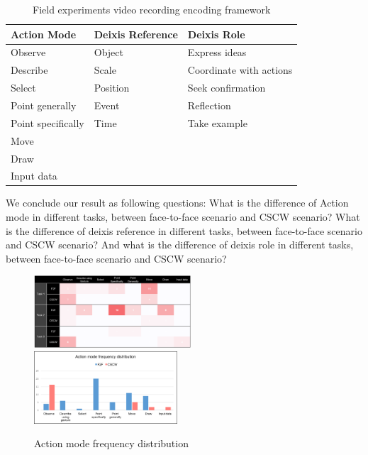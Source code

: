 \documentclass[12pt,twoside]{article}
\begin{document}
\begin{table}
\begin{tabular}{p{6cm}p{6cm}p{4.6cm}}
\hline
Action Mode & Deixis Reference & Deixis Role\\
\hline
Observe & Object & Express ideas\\
Describe & Scale & Coordinate with actions\\
Select & Position & Seek confirmation\\
Point generally & Event & Reflection \\
Point specifically & Time & Take example \\
Move & & \\
Draw & & \\
Input data & & \\
\hline
\end{tabular}
\caption{Field experiments video recording encoding framework}
\label{framework}
\end{table}

We conclude our result as following questions: What is the difference of Action mode in different tasks, between face-to-face scenario and CSCW scenario? What is the difference of deixis reference in different tasks, between face-to-face scenario and CSCW scenario? And what is the difference of deixis role in different tasks, between face-to-face scenario and CSCW scenario?

\begin{figure}
\includegraphics[width = 0.522\textwidth]{action_mode_a.png}
\includegraphics[width = 0.476\textwidth]{action_mode_b.png}
\caption{Action mode frequency distribution}
\label{actionmode}
\end{figure}
\end{document}
